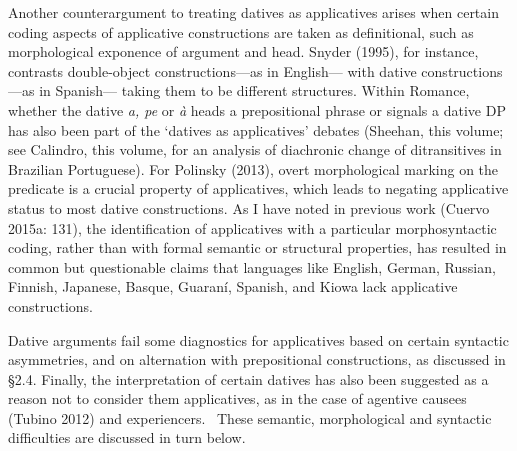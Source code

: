 \documentclass[12pt]{article}
\newenvironment{styleStandard}{\setlength\leftskip{0cm}\setlength\rightskip{0cm plus 1fil}\setlength\parindent{0cm}\setlength\parfillskip{0pt plus 1fil}\setlength\parskip{0in plus 1pt}\writerlistparindent\writerlistleftskip\leavevmode\normalfont\normalsize\writerlistlabel\ignorespaces}{\unskip\vspace{0.111in plus 0.0111in}\par}
\newcommand\writerlistleftskip{}
\newcommand\writerlistparindent{}
\newcommand\writerlistlabel{}
\begin{document}
\begin{styleStandard}
Another counterargument to treating datives as applicatives arises when certain coding aspects of applicative constructions are taken as definitional, such as morphological exponence of argument and head. Snyder (1995), for instance, contrasts double-object constructions—as in English— with dative constructions—as in Spanish— taking them to be different structures. Within Romance, whether the dative \textit{a, pe} or \textit{à} heads a prepositional phrase or signals a dative DP has also been part of the ‘datives as applicatives’ debates (Sheehan, this volume; see Calindro, this volume, for an analysis of diachronic change of ditransitives in Brazilian Portuguese). For Polinsky (2013), overt morphological marking on the predicate is a crucial property of applicatives, which leads to negating applicative status to most dative constructions. As I have noted in previous work (Cuervo 2015a: 131), the identification of applicatives with a particular morphosyntactic coding, rather than with formal semantic or structural properties, has resulted in common but questionable claims that languages like English, German, Russian, Finnish, Japanese, Basque, Guaraní, Spanish, and Kiowa lack applicative constructions.
\end{styleStandard}

\begin{styleStandard}
Dative arguments fail some diagnostics for applicatives based on certain syntactic asymmetries, and on alternation with prepositional constructions, as discussed in §2.4. Finally, the interpretation of certain datives has also been suggested as a reason not to consider them applicatives, as in the case of agentive causees (Tubino 2012) and experiencers. \ These semantic, morphological and syntactic difficulties are discussed in turn below. 
\end{styleStandard}
\end{document}
